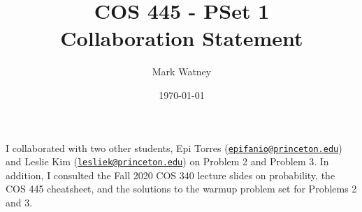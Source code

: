 \documentclass[12pt]{article}%
\begin{document}
\title{COS 445 - PSet 1 \\ Collaboration Statement} %
\author{Mark Watney} %
\date{\today}
\maketitle

I collaborated with two other students, Epi Torres (\href{mailto:epifanio@princeton.edu}{\nolinkurl{epifanio@princeton.edu}}) and Leslie Kim (\href{mailto:lesliek@princeton.edu}{\nolinkurl{lesliek@princeton.edu}}) on Problem 2 and Problem 3. In addition, I consulted the Fall 2020 COS 340 lecture slides on probability, the COS 445 cheatsheet, and the solutions to the warmup problem set for Problems 2 and 3.
\end{document}
